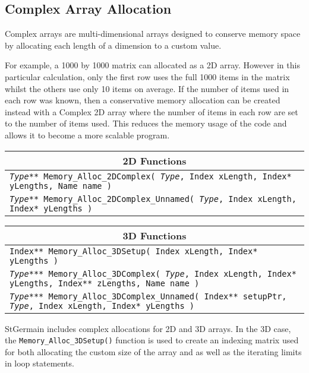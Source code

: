 \documentclass[a4paper,12pt]{article}
\begin{document}
\subsection{Complex Array Allocation}
Complex arrays are multi-dimensional arrays designed to conserve memory space
by allocating each length of a dimension to a custom value.

For example, a 1000 by 1000 matrix can allocated as a 2D array. However in this
particular calculation, only the first row uses the full 1000 items in the
matrix whilst the others use only 10 items on average. If the number of items
used in each row was known, then a conservative memory allocation can be
created instead with a Complex 2D array where the number of items in each row
are set to the number of items used. This reduces the memory usage of the code
and allows it to become a more scalable program.

\begin{table}[h]
  \begin{tabular}{|p{13.3cm}|}
    \hline \multicolumn{1}{|c|}{\textbf{2D Functions}} \\ \hline
    \texttt{\textit{Type}** Memory\_Alloc\_2DComplex( \textit{Type}, Index xLength, Index* yLengths, Name name )} \\ \hline
    \texttt{\textit{Type}** Memory\_Alloc\_2DComplex\_Unnamed( \textit{Type}, Index xLength, Index* yLengths )} \\ \hline
  \end{tabular}
\end{table}

\begin{table}[h]
  \begin{tabular}{|p{13.3cm}|}
    \hline \multicolumn{1}{|c|}{\textbf{3D Functions}} \\ \hline
    \texttt{Index** Memory\_Alloc\_3DSetup( Index xLength, Index* yLengths )} \\ \hline
    \texttt{\textit{Type}*** Memory\_Alloc\_3DComplex( \textit{Type}, Index xLength, Index* yLengths, Index** zLengths, Name name )} \\ \hline
    \texttt{\textit{Type}*** Memory\_Alloc\_3DComplex\_Unnamed( Index** setupPtr, \textit{Type}, Index xLength, Index* yLengths )} \\ \hline
  \end{tabular}
\end{table}

StGermain includes complex allocations for 2D and 3D arrays. In the 3D case, the \texttt{Memory\_Alloc\_3DSetup()} function is used to create an indexing matrix used for both allocating the custom size of the array and as well as the iterating limits in loop statements.
\end{document}

